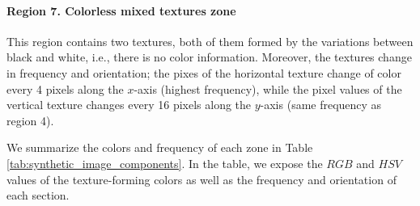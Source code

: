 \documentclass[journal]{IEEEtran}
\begin{document}
\paragraph{Region 7. Colorless mixed textures zone}
This region contains two textures, both of them formed by the variations between black and white, i.e., there is no color information. Moreover, the textures change in frequency and orientation; the pixes of the horizontal texture change of color every 4 pixels along the $x$-axis (highest frequency), while the pixel values of the vertical texture changes every 16 pixels along the $y$-axis (same frequency as region 4).

We summarize the colors and frequency of each zone in Table \ref{tab:synthetic_image_components}. In the table, we expose the $RGB$ and $HSV$ values of the texture-forming colors as well as the frequency and orientation of each section.
\end{document}
